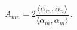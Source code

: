 \begin{equation}
\label{cartan} A_{mn}=2\frac{\langle\alpha_m,\alpha_n\rangle}{\langle\alpha_m, 
\alpha_m \rangle}\, .
\end{equation}


